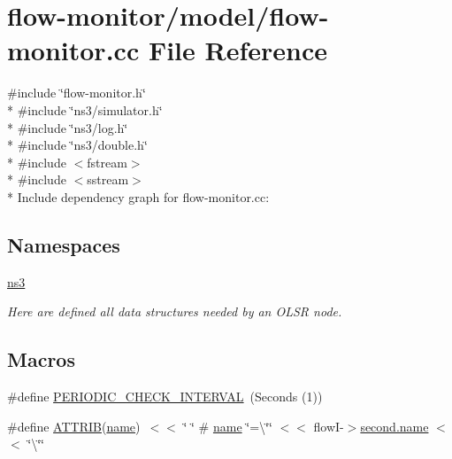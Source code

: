 \hypertarget{flow-monitor_8cc}{}\section{flow-\/monitor/model/flow-\/monitor.cc File Reference}
\label{flow-monitor_8cc}
{\ttfamily \#include \char`\"{}flow-\/monitor.\+h\char`\"{}}\\*
{\ttfamily \#include \char`\"{}ns3/simulator.\+h\char`\"{}}\\*
{\ttfamily \#include \char`\"{}ns3/log.\+h\char`\"{}}\\*
{\ttfamily \#include \char`\"{}ns3/double.\+h\char`\"{}}\\*
{\ttfamily \#include $<$fstream$>$}\\*
{\ttfamily \#include $<$sstream$>$}\\*
Include dependency graph for flow-\/monitor.cc\+:
\subsection*{Namespaces}
\begin{DoxyCompactItemize}
\item 
 \hyperlink{namespacens3}{ns3}
\begin{DoxyCompactList}\small\item\em Here are defined all data structures needed by an O\+L\+SR node. \end{DoxyCompactList}\end{DoxyCompactItemize}
\subsection*{Macros}
\begin{DoxyCompactItemize}
\item 
\#define \hyperlink{flow-monitor_8cc_a5dd20e7228cdecf9cbe6936c31d53f42}{P\+E\+R\+I\+O\+D\+I\+C\+\_\+\+C\+H\+E\+C\+K\+\_\+\+I\+N\+T\+E\+R\+V\+AL}~(Seconds (1))
\item 
\#define \hyperlink{flow-monitor_8cc_a2f49aa9c01217bb2ae9f582c391292cb}{A\+T\+T\+R\+IB}(\hyperlink{generate__test__data__lte__spectrum__model_8m_ab74e6bf80237ddc4109968cedc58c151}{name})~$<$$<$ \char`\"{} \char`\"{} \# \hyperlink{generate__test__data__lte__spectrum__model_8m_ab74e6bf80237ddc4109968cedc58c151}{name} \char`\"{}=\textbackslash{}\char`\"{}\char`\"{} $<$$<$ flowI-\/$>$\hyperlink{generate__test__data__lte__spectrum__model_8m_ab74e6bf80237ddc4109968cedc58c151}{second.\+name} $<$$<$ \char`\"{}\textbackslash{}\char`\"{}\char`\"{}
\end{DoxyCompactItemize}
